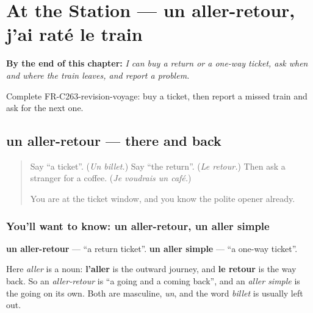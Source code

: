 
\chapter{At the Station — un aller-retour, j'ai raté le train}
\label{ch:fr-at-the-station}

\begin{chapteropening}
\textbf{By the end of this chapter:} \emph{I can buy a return or a one-way ticket, ask when and where the train leaves, and report a problem.}

Complete FR-C263-revision-voyage: buy a ticket, then report a missed train and ask for the next one.
\end{chapteropening}

\section[un aller-retour, un aller simple]{un aller-retour — there and back}

\label{lesson:FR-C263-aller-retour}



\begin{quote}
Say \textquotedblleft{}a ticket\textquotedblright{}. (\emph{Un billet.}) Say \textquotedblleft{}the return\textquotedblright{}. (\emph{Le retour.}) Then ask a stranger for a coffee. (\emph{Je voudrais un café.})

You are at the ticket window, and you know the polite opener already.
\end{quote}

\subsection*{You'll want to know: un aller-retour, un aller simple}
\textbf{un aller-retour} — \textquotedblleft{}a return ticket\textquotedblright{}. \textbf{un aller simple} — \textquotedblleft{}a one-way ticket\textquotedblright{}.

Here \emph{aller} is a noun: \textbf{l'aller} is the outward journey, and \textbf{le retour} is the way back. So an \emph{aller-retour} is \textquotedblleft{}a going and a coming back\textquotedblright{}, and an \emph{aller simple} is the going on its own. Both are masculine, \emph{un}, and the word \emph{billet} is usually left out.

